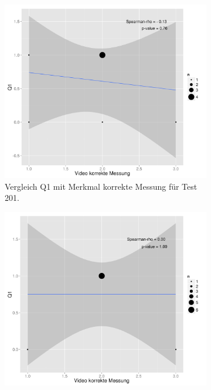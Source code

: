  \begin{figure}[htp]
  \centering
  \begin{subfigure}{0.32\textwidth}
    \includegraphics[width=1.0\linewidth]{graphics/corVideoQ1201.png}
    \caption{Vergleich Q1 mit Merkmal korrekte Messung für Test 201.}
    \label{fig:corVideoQ1201}
  \end{subfigure}
  \begin{subfigure}{0.32\textwidth}
    \includegraphics[width=1.0\linewidth]{graphics/corVideoQ1301.png}

\end{subfigure}
\end{figure}

